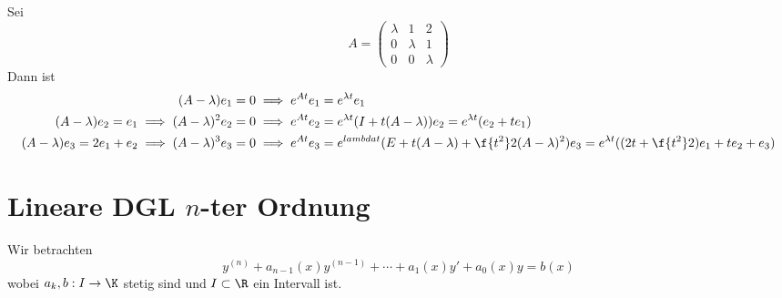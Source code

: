 \documentclass[a4paper,10pt]{scrbook}
\begin{document}
\begin{ex*}
	Sei
	\[
		A = \begin{pmatrix}\lambda & 1 & 2\\ 0& \lambda&1\\ 0& 0& \lambda\end{pmatrix}
	\]
	Dann ist
	\begin{align*}
		(A-\lambda)e_1 = 0 &\implies e^{At}e_1 = e^{\lambda t}e_1\\
		(A-\lambda)e_2 = e_1 \implies (A-\lambda)^2e_2 = 0 &\implies e^{At}e_2 = e^{\lambda t}(I+t(A-\lambda))e_2 = e^{\lambda t}(e_2 + t e_1)\\
		(A-\lambda)e_3 = 2e_1 + e_2 \implies (A-\lambda)^3e_3 = 0 &\implies e^{At}e_3 = e^{lambda t}(E + t(A-\lambda) + \f{t^2}2 (A-\lambda)^2) e_3 = e^{\lambda t}((2t + \f {t^2}2)e_1 + te_2 + e_3)
	\end{align*}
\end{ex*}


\section{Lineare DGL $n$-ter Ordnung}


Wir betrachten
\[
	y^{(n)} + a_{n-1}(x)y^{(n-1)} + \dotsb + a_1(x)y' + a_0(x)y = b(x)
\]
wobei $a_k, b : I\to \K$ stetig sind und $I\subset \R$ ein Intervall ist.
\end{document}
